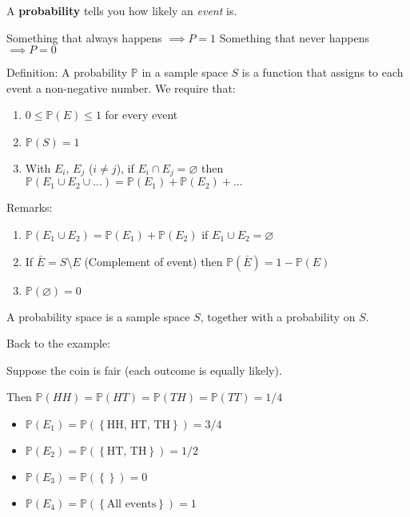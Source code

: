 \documentclass[main.tex]{subfiles}
\begin{document}
A \textbf{probability} tells you how likely an \textit{event} is.

Something that always happens $\implies P = 1$
Something that never happens $\implies P = 0$

Definition: A probability $\mathbb{P}$ in a sample space $S$ is a function that assigns to each event a non-negative number.
We require that:
\begin{enumerate}
    \item $0 \le \mathbb{P}(E) \le 1$ for every event
    \item $\mathbb{P}(S) = 1$
    \item With $E_i$, $E_j$ ($i \neq j$), if $E_i \cap E_j = \varnothing$ then $\mathbb{P}(E_1\cup E_2\cup...) = \mathbb{P}(E_1) + \mathbb{P}(E_2) + ...$
\end{enumerate}

Remarks:
\begin{enumerate}
    \item $\mathbb{P}(E_1\cup E_2) = \mathbb{P}(E_1) + \mathbb{P}(E_2)$ if $E_1 \cup E_2 = \varnothing$
    \item If $\bar{E} = S \setminus E$ (Complement of event) then $\mathbb{P}(\bar{E}) = 1 - \mathbb{P}(E)$
    \item $\mathbb{P}(\varnothing) = 0$
\end{enumerate}

A probability space is a sample space $S$, together with a probability on $S$.

Back to the example:

Suppose the coin is fair (each outcome is equally likely).

Then $\mathbb{P}(HH) = \mathbb{P}(HT) = \mathbb{P}(TH) = \mathbb{P}(TT) = 1/4$
\begin{itemize}
    \item $\mathbb{P}(E_1) = \mathbb{P}(\left\{\textrm{HH, HT, TH}\right\}) = 3/4$
    \item $\mathbb{P}(E_2) = \mathbb{P}(\left\{\textrm{HT, TH}\right\}) = 1/2$
    \item $\mathbb{P}(E_3) = \mathbb{P}(\left\{\right\}) = 0$
    \item $\mathbb{P}(E_4) = \mathbb{P}(\left\{\textrm{All events}\right\}) = 1$
\end{itemize}
\end{document}
